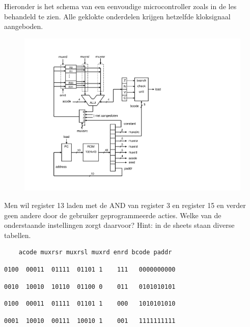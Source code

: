 \documentclass[a4paper,12pt,fleqn,dutch]{tisdexam}
\begin{document}
\begin{questions}
\question
\label{opg:opg21}
Hieronder is het schema van een eenvoudige microcontroller zoals in de les behandeld te
zien. Alle geklokte onderdelen krijgen hetzelfde kloksignaal aangeboden.
\begin{figure}[H]
  \centering
    \includegraphics*[viewport=100 50 540 550,scale=0.55]{pINLMIC_avr_thr_v4.pdf}
\end{figure}


Men wil register 13 laden met de AND van register 3 en register 15 en verder geen andere
door de gebruiker geprogrammeerde acties. Welke van de onderstaande
instellingen zorgt daarvoor? Hint: in de sheets staan diverse tabellen.\\
\begin{verbatim}    acode muxrsr muxrsl muxrd enrd bcode paddr\end{verbatim}
\begin{choices}
	\choice \begin{verbatim}0100  00011  01111  01101 1    111   0000000000\end{verbatim}
	\choice \begin{verbatim}0010  10010  10110  01100 0    011   0101010101\end{verbatim}
	\CorrectChoice \label{ans:opg21} \begin{verbatim}0100  00011  01111  01101 1    000   1010101010\end{verbatim}
	\choice \begin{verbatim}0001  10010  00111  10010 1    001   1111111111\end{verbatim}
\end{choices}



\end{questions}
\end{document}
